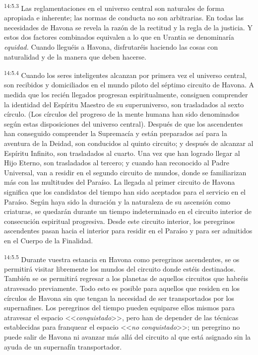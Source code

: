 \par
\textsuperscript{14:5.3} Las reglamentaciones en el universo central son naturales de forma apropiada e inherente; las normas de conducta no son arbitrarias. En todas las necesidades de Havona se revela la razón de la rectitud y la regla de la justicia. Y estos dos factores combinados equivalen a lo que en Urantia se denominaría \textit{equidad.} Cuando lleguéis a Havona, disfrutaréis haciendo las cosas con naturalidad y de la manera que deben hacerse.

\par
\textsuperscript{14:5.4} Cuando los seres inteligentes alcanzan por primera vez el universo central, son recibidos y domiciliados en el mundo piloto del séptimo circuito de Havona. A medida que los recién llegados progresan espiritualmente, consiguen comprender la identidad del Espíritu Maestro de su superuniverso, son trasladados al sexto círculo. (Los círculos del progreso de la mente humana han sido denominados según estas disposiciones del universo central). Después de que los ascendentes han conseguido comprender la Supremacía y están preparados así para la aventura de la Deidad, son conducidos al quinto circuito; y después de alcanzar al Espíritu Infinito, son trasladados al cuarto. Una vez que han logrado llegar al Hijo Eterno, son trasladados al tercero; y cuando han reconocido al Padre Universal, van a residir en el segundo circuito de mundos, donde se familiarizan más con las multitudes del Paraíso. La llegada al primer circuito de Havona significa que los candidatos del tiempo han sido aceptados para el servicio en el Paraíso. Según haya sido la duración y la naturaleza de su ascensión como criaturas, se quedarán durante un tiempo indeterminado en el circuito interior de consecución espiritual progresiva. Desde este circuito interior, los peregrinos ascendentes pasan hacia el interior para residir en el Paraíso y para ser admitidos en el Cuerpo de la Finalidad.

\par
\textsuperscript{14:5.5} Durante vuestra estancia en Havona como peregrinos ascendentes, se os permitirá visitar libremente los mundos del circuito donde estéis destinados. También se os permitirá regresar a los planetas de aquellos circuitos que habréis atravesado previamente. Todo esto es posible para aquellos que residen en los círculos de Havona sin que tengan la necesidad de ser transportados por los supernafines. Los peregrinos del tiempo pueden equiparse ellos mismos para atravesar el espacio <<\textit{conquistado}>>, pero han de depender de las técnicas establecidas para franquear el espacio <<\textit{no conquistado}>>; un peregrino no puede salir de Havona ni avanzar más allá del circuito al que está asignado sin la ayuda de un supernafín transportador.

